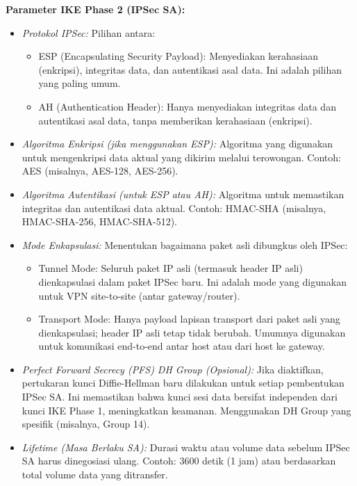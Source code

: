 \begin{enumerate}
\begin{itemize}
        \textbf{Parameter IKE Phase 2 (IPSec SA):}
        \begin{itemize}
            \item \textit{Protokol IPSec:} Pilihan antara:
                \begin{itemize}
                    \item ESP (Encapsulating Security Payload): Menyediakan kerahasiaan (enkripsi), integritas data, dan autentikasi asal data. Ini adalah pilihan yang paling umum.
                    \item AH (Authentication Header): Hanya menyediakan integritas data dan autentikasi asal data, tanpa memberikan kerahasiaan (enkripsi).
                \end{itemize}
            \item \textit{Algoritma Enkripsi (jika menggunakan ESP):} Algoritma yang digunakan untuk mengenkripsi data aktual yang dikirim melalui terowongan. Contoh: AES (misalnya, AES-128, AES-256).
            \item \textit{Algoritma Autentikasi (untuk ESP atau AH):} Algoritma untuk memastikan integritas dan autentikasi data aktual. Contoh: HMAC-SHA (misalnya, HMAC-SHA-256, HMAC-SHA-512).
            \item \textit{Mode Enkapsulasi:} Menentukan bagaimana paket asli dibungkus oleh IPSec:
                \begin{itemize}
                    \item Tunnel Mode: Seluruh paket IP asli (termasuk header IP asli) dienkapsulasi dalam paket IPSec baru. Ini adalah mode yang digunakan untuk VPN site-to-site (antar gateway/router).
                    \item Transport Mode: Hanya payload lapisan transport dari paket asli yang dienkapsulasi; header IP asli tetap tidak berubah. Umumnya digunakan untuk komunikasi end-to-end antar host atau dari host ke gateway.
                \end{itemize}
            \item \textit{Perfect Forward Secrecy (PFS) DH Group (Opsional):} Jika diaktifkan, pertukaran kunci Diffie-Hellman baru dilakukan untuk setiap pembentukan IPSec SA. Ini memastikan bahwa kunci sesi data bersifat independen dari kunci IKE Phase 1, meningkatkan keamanan. Menggunakan DH Group yang spesifik (misalnya, Group 14).
            \item \textit{Lifetime (Masa Berlaku SA):} Durasi waktu atau volume data sebelum IPSec SA harus dinegosiasi ulang. Contoh: 3600 detik (1 jam) atau berdasarkan total volume data yang ditransfer.
        \end{itemize}


\end{itemize}
\end{enumerate}
